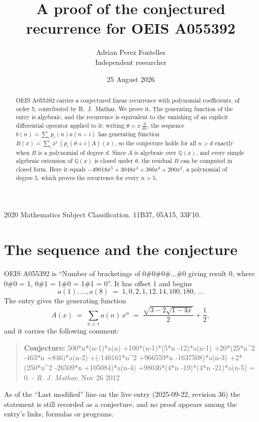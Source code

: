 \documentclass[11pt,a4paper]{article}
\title{A proof of the conjectured recurrence for OEIS A055392}
\author{Adrian Perez Fontelles\\ \small Independent researcher}
\date{25 August 2026}
\theoremstyle{plain}
\theoremstyle{definition}
\begin{document}
\maketitle

\begin{abstract}
OEIS A055392 carries a conjectured linear recurrence with polynomial coefficients, of
order 5, contributed by R.~J.~Mathar. We prove it. The generating function of the
entry is algebraic, and the recurrence is equivalent to the vanishing of an explicit
differential operator applied to it: writing $\theta=x\,\frac{d}{dx}$, the sequence
$b(n)=\sum_{i}p_{i}(n)a(n-i)$ has generating function
$B(x)=\sum_{i}x^{i}\,(p_{i}(\theta+i)A)(x)$, so the conjecture holds for all $n>d$ exactly
when $B$ is a polynomial of degree $d$. Since $A$ is algebraic over $\mathbb{Q}(x)$, and every simple
algebraic extension of $\mathbb{Q}(x)$ is closed under $\theta$, the residual $B$ can be
computed in closed form. Here it equals $- 49018 x^{5} + 3048 x^{4} + 360 x^{3} + 200 x^{2}$, a polynomial of degree $5$, which proves
the recurrence for every $n>5$.
\end{abstract}

\noindent\small 2020 Mathematics Subject Classification. 11B37, 05A15, 33F10.\normalsize

\section{The sequence and the conjecture}

OEIS A055392 is ``Number of bracketings of 0\#0\#0\#...\#0 giving result 0, where 0\#0 = 1, 0\#1 = 1\#0 = 1\#1 = 0''. It has offset $1$ and begins
\[
a(1),\dots,a(8)\;=\;1, 0, 2, 1, 12, 14, 100, 180,\ \dots
\]
The entry gives the generating function
\begin{equation}\label{eq:gf}
A(x)\;=\;\sum_{n\ge 1} a(n)\,x^{n}\;=\;\frac{\sqrt{3 - 2 \sqrt{1 - 4 x}}}{2} + \frac{1}{2} ,
\end{equation}
and it carries the following comment:
\begin{quote}\small
\textbf{Conjecture:} 500*n*(n-1)*a(n) +100*(n-1)*(5*n -12)*a(n-1) +20*(25*n\^{}2 -463*n +846)*a(n-2) +(-140161*n\^{}2 +966559*n -1637508)*a(n-3) +2*(250*n\^{}2 -26509*n +105084)*a(n-4) +98036*(4*n -19)*(4*n -21)*a(n-5) = 0. - \emph{R. J. Mathar}, Nov 26 2012
\end{quote}
As of the ``Last modified'' line on the live entry (2025-09-22, revision 36) the
statement is still recorded as a conjecture, and no proof appears among the entry's links,
formulas or programs.
\end{document}
